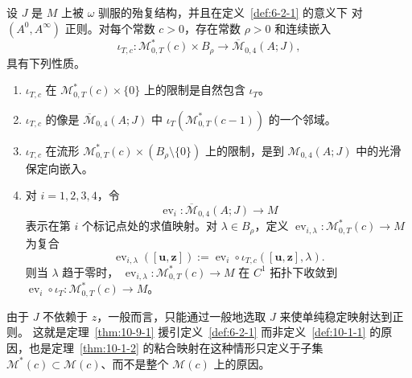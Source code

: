 \begin{theorem}\label{thm:10-9-1}
设 $J$ 是 $M$ 上被 $\omega$ 驯服的殆复结构，并且在定义~\ref{def:6-2-1} 的意义下
对 $(A^0,A^\infty)$ 正则。对每个常数 $c>0$，存在常数 $\rho>0$ 和连续嵌入
\[
  \iota_{T,c}:\mathcal M_{0,T}^*(c)\times B_\rho
  \longrightarrow\overline{\mathcal M}_{0,4}(A;J),
\]
具有下列性质。
\begin{enumerate}[label=(\roman*)]
\item $\iota_{T,c}$ 在 $\mathcal M_{0,T}^*(c)\times\{0\}$ 上的限制是自然包含
$\iota_T$。
\item $\iota_{T,c}$ 的像是
$\overline{\mathcal M}_{0,4}(A;J)$ 中
$\iota_T(\mathcal M_{0,T}^*(c-1))$ 的一个邻域。
\item $\iota_{T,c}$ 在流形
$\mathcal M_{0,T}^*(c)\times(B_\rho\setminus\{0\})$ 上的限制，是到
$\mathcal M_{0,4}(A;J)$ 中的光滑保定向嵌入。
\item 对 $i=1,2,3,4$，令
\[
  \operatorname{ev}_i:\overline{\mathcal M}_{0,4}(A;J)\longrightarrow M
\]
表示在第 $i$ 个标记点处的求值映射。对 $\lambda\in B_\rho$，定义
$\operatorname{ev}_{i,\lambda}:\mathcal M_{0,T}^*(c)\to M$ 为复合
\[
  \operatorname{ev}_{i,\lambda}([\mathbf u,\mathbf z])
  :=\operatorname{ev}_i\circ
  \iota_{T,c}([\mathbf u,\mathbf z],\lambda).
\]
则当 $\lambda$ 趋于零时，
$\operatorname{ev}_{i,\lambda}:\mathcal M_{0,T}^*(c)\to M$ 在 $C^1$ 拓扑下收敛到
$\operatorname{ev}_i\circ\iota_T:\mathcal M_{0,T}^*(c)\to M$。
\end{enumerate}
\end{theorem}

\begin{remark}\label{rem:10-9-2}
由于 $J$ 不依赖于 $z$，一般而言，只能通过一般地选取 $J$ 来使单纯稳定映射达到正则。
这就是定理~\ref{thm:10-9-1} 援引定义~\ref{def:6-2-1} 而非定义~\ref{def:10-1-1}
的原因，也是定理~\ref{thm:10-1-2} 的粘合映射在这种情形只定义于子集
$\mathcal M^*(c)\subset\mathcal M(c)$、而不是整个 $\mathcal M(c)$ 上的原因。
\end{remark}

